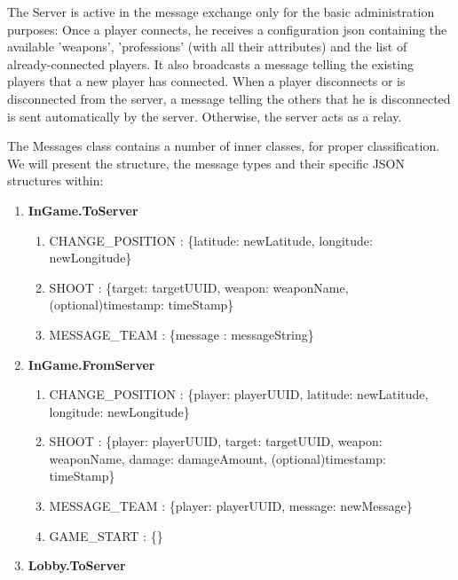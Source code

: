 The Server is active in the message exchange only for the basic administration
purposes: Once a player connects, he receives a configuration json containing
the available 'weapons', 'professions' (with all their attributes) and the list
of already-connected players. It also broadcasts a message telling the existing
players that a new player has connected. When a player disconnects or is
disconnected from the server, a message telling the others that he is
disconnected is sent automatically by the server. Otherwise, the server acts as
a relay.\newline

The Messages class contains a number of inner classes, for proper
classification. We will present the structure, the message types and their
specific JSON structures within:

\begin{enumerate}
  \item \textbf{InGame.ToServer}  
  \begin{enumerate}
    \item CHANGE\_POSITION :
    \{latitude: newLatitude, longitude: newLongitude\}
    
    \item SHOOT :
    \{target: targetUUID, weapon: weaponName, (optional)timestamp: timeStamp\}
        
    \item MESSAGE\_TEAM :
    \{message : messageString\}
      
  \end{enumerate}  
  
  \item \textbf{InGame.FromServer}  
  \begin{enumerate}
    \item CHANGE\_POSITION :
    \{player: playerUUID, latitude: newLatitude, longitude: newLongitude\}
    
    \item SHOOT :
    \{player: playerUUID, target: targetUUID, weapon: weaponName, damage:    
    damageAmount, (optional)timestamp: timeStamp\}
    
    \item MESSAGE\_TEAM :
    \{player: playerUUID, message: newMessage\}
    
    \item GAME\_START :
    \{\} 
        
  \end{enumerate}  
  
  \item \textbf{Lobby.ToServer}
  

\end{enumerate}

